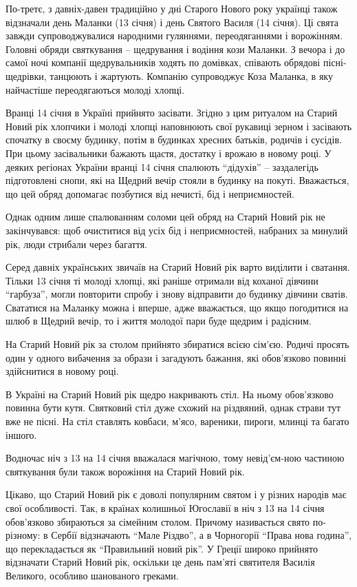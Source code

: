 По-третє, з давніх-давен традиційно у дні Старого Нового року українці також
відзначали день Маланки (13 січня) і день Святого Василя (14 січня). Ці свята
завжди супроводжувалися народними гуляннями, переодяганнями і ворожінням.
Головні обряди святкування – щедрування і водіння кози Маланки. З вечора і до
самої ночі компанії щедрувальників ходять по домівках, співають обрядові
пісні-щедрівки, танцюють і жартують. Компанію супроводжує Коза Маланка, в яку
найчастіше переодягаються молоді хлопці.

Вранці 14 січня в Україні прийнято засівати. Згідно з цим ритуалом на Старий
Новий рік хлопчики і молоді хлопці наповнюють свої рукавиці зерном і засівають
спочатку в своєму будинку, потім в будинках хресних батьків, родичів і сусідів.
При цьому засівальники бажають щастя, достатку і врожаю в новому році. У деяких
регіонах України вранці 14 січня спалюють \enquote{дідухів} – заздалегідь підготовлені
снопи, які на Щедрий вечір стояли в будинку на покуті. Вважається, що цей обряд
допомагає позбутися від нечисті, бід і неприємностей.

Однак одним лише спалюванням соломи цей обряд на Старий Новий рік не
закінчувався: щоб очиститися від усіх бід і неприємностей, набраних за минулий
рік, люди стрибали через багаття.

Серед давніх українських звичаїв на Старий Новий рік варто виділити і сватання.
Тільки 13 січня ті молоді хлопці, які раніше отримали від коханої дівчини
\enquote{гарбуза}, могли повторити спробу і знову відправити до будинку дівчини сватів.
Свататися на Маланку можна і вперше, адже вважається, що якщо погодитися на
шлюб в Щедрий вечір, то і життя молодої пари буде щедрим і радісним.

На Старий Новий рік за столом прийнято збиратися всією сім'єю. Родичі просять
один у одного вибачення за образи і загадують бажання, які обов'язково повинні
здійснитися в новому році.

В Україні на Старий Новий рік щедро накривають стіл. На ньому обов'язково
повинна бути кутя. Святковий стіл дуже схожий на різдвяний, однак страви тут
вже не пісні. На стіл ставлять ковбаси, м'ясо, вареники, пироги, млинці та
багато іншого.

Водночас ніч з 13 на 14 січня вважалася магічною, тому невід'єм\hyp{}ною частиною
святкування були також ворожіння на Старий Новий рік.

Цікаво, що Старий Новий рік є доволі популярним святом і у різних народів має
свої особливості. Так, в країнах колишньої Югославії в ніч з 13 на 14 січня
обов'язково збираються за сімейним столом. Причому називається свято
по-різному: в Сербії відзначають \enquote{Мале Різдво}, а в Чорногорії \enquote{Права нова
година}, що перекладається як \enquote{Правильний новий рік}. У Греції широко прийнято
відзначати Старий Новий рік, оскільки це день пам'яті святителя Василія
Великого, особливо шанованого греками.

